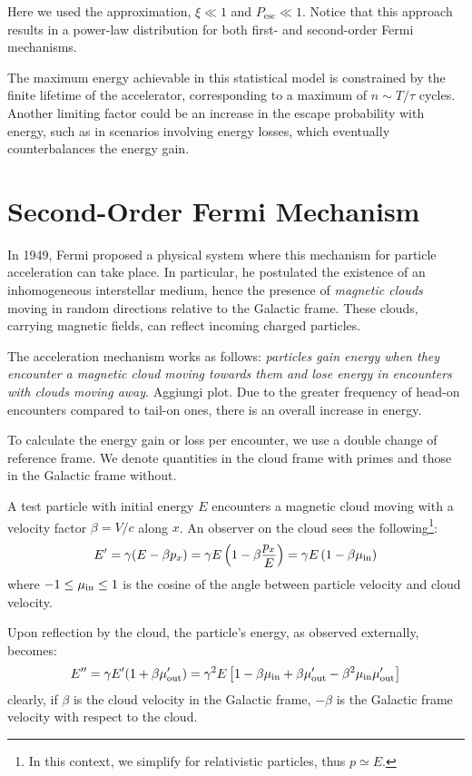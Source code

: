 Here we used the approximation, \( \xi \ll 1 \) and \( P_{\text{esc}} \ll 1 \). Notice that this approach results in a power-law distribution for both first- and second-order Fermi mechanisms.

The maximum energy achievable in this statistical model is constrained by the finite lifetime of the accelerator, corresponding to a maximum of \( n \sim T / \tau \) cycles. Another limiting factor could be an increase in the escape probability with energy, such as in scenarios involving energy losses, which eventually counterbalances the energy gain.

\section{Second-Order Fermi Mechanism}

In 1949, Fermi proposed a physical system where this mechanism for particle acceleration can take place. In particular, he postulated the existence of an inhomogeneous interstellar medium, hence the presence of \emph{magnetic clouds} moving in random directions relative to the Galactic frame. These clouds, carrying magnetic fields, can reflect incoming charged particles.

The acceleration mechanism works as follows: \emph{particles gain energy when they encounter a magnetic cloud moving towards them and lose energy in encounters with clouds moving away}. {\color{red}Aggiungi plot.} Due to the greater frequency of head-on encounters compared to tail-on ones, there is an overall increase in energy.

To calculate the energy gain or loss per encounter, we use a double change of reference frame. We denote quantities in the cloud frame with primes and those in the Galactic frame without.

A test particle with initial energy \( E \) encounters a magnetic cloud moving with a velocity factor \( \beta = V/c \) along $x$. An observer on the cloud sees the following\footnote{In this context, we simplify for relativistic particles, thus \( p \simeq E \).
}:
%
\begin{equation}
E' = \gamma (E - \beta p_x) = \gamma E \left(1 - \beta \frac{p_x}{E} \right) = \gamma E \left(1 - \beta \mu_{\rm in} \right)
\end{equation}
%
where \( -1 \le \mu_{\rm in} \le 1 \) is the cosine of the angle between particle velocity and cloud velocity. 

Upon reflection by the cloud, the particle's energy, as observed externally, becomes:
%
\begin{equation}
E^{\prime\prime} 
= \gamma E^\prime (1+ \beta \mu^\prime_{\rm out}) 
= \gamma^2 E \left[ 1 - \beta \mu_{\rm in} + \beta \mu^\prime_{\rm out} - \beta^2 \mu_{\rm in} \mu^\prime_{\rm out} \right]
\end{equation}
%
clearly, if $\beta$ is the cloud velocity in the Galactic frame, $-\beta$ is the Galactic frame velocity with respect to the cloud.

